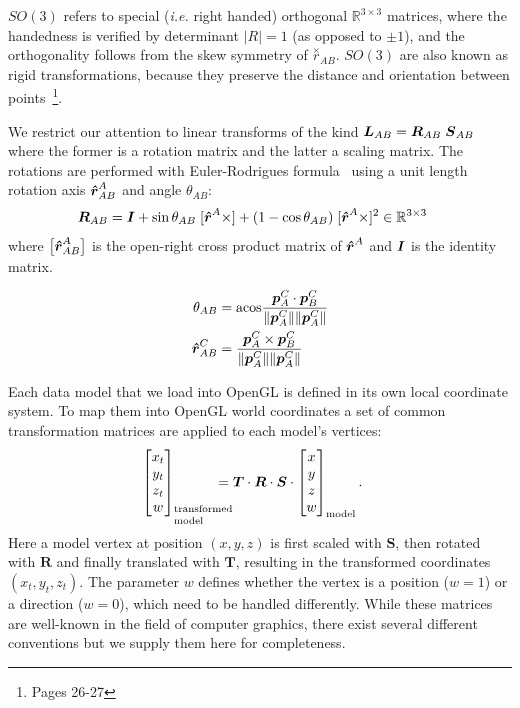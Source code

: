 $SO(3)$ refers to special (\emph{i.e.} right handed) orthogonal $\mathbb{R}^{3\times3}$ matrices, where the handedness is verified by determinant $\big|R\big|=1$ (as opposed to $\pm1$), and the orthogonality follows from the skew symmetry of $\overset{\times}{r}_{AB}$. $SO(3)$ are also known as rigid transformations, because they preserve the distance and orientation between points~\cite{Murray1994}\footnote{Pages 26-27}.

We restrict our attention to linear transforms of the kind $\boldsymbol{L}_{AB} = \boldsymbol{R}_{AB}\;\boldsymbol{S}_{AB}$ where the former is a rotation matrix and the latter a scaling matrix. The rotations are performed with Euler-Rodrigues formula~\cite{Dai2015} using a unit length rotation axis $\boldsymbol{\hat{r}}_{AB}^A$ and angle $\theta_{AB}$:
%
\begin{align}\label{eq:M}
\mat{R}_{AB} &= \I + \sin\theta_{AB}\;[\dvec{\hat{r}}^A\times] + (1-\cos\theta_{AB})\;[\dvec{\hat{r}}^A\times]^2 \in\mathbb{R}^{3\times3}
\end{align}
%
where $\big[\boldsymbol{\hat{r}}_{AB}^A\big]$ is the open-right cross product matrix of $\boldsymbol{\hat{r}}^A$ and $\boldsymbol{I}$ is the identity matrix. 

\begin{align}
\theta_{AB}
&= \mathrm{acos}\frac{\boldsymbol{p}_{A}^{C}\cdot\boldsymbol{p}_{B}^{C}}{\lVert\boldsymbol{p}_{A}^{C}\rVert\lVert\boldsymbol{p}_{A}^{C}\rVert} \\
\boldsymbol{\hat{r}}_{AB}^C &=  \frac{\boldsymbol{p}_{A}^{C}\times\boldsymbol{p}_{B}^{C}}{\lVert\boldsymbol{p}_{A}^{C}\rVert\lVert\boldsymbol{p}_{A}^{C}\rVert}
\end{align}


Each data model that we load into OpenGL is defined in its own local coordinate system. To map them into OpenGL world coordinates a set of common transformation matrices are applied to each model's vertices:
%
\begin{align}
\bmat{x_t \\ y_t \\ z_t \\ w}_\text{\parbox{1cm}{\setlength\baselineskip{0.3cm}transformed\\model}} &= \boldsymbol{T} \cdot \boldsymbol{R} \cdot \boldsymbol{S} \cdot \bmat{x \\ y \\ z \\ w}_\text{model}.
\end{align}
%
Here a model vertex at position $(x,y,z)$ is first scaled with $\boldsymbol{S}$, then rotated with $\boldsymbol{R}$ and finally translated with $\boldsymbol{T}$, resulting in the transformed coordinates $(x_t,y_t,z_t)$. The parameter $w$ defines whether the vertex is a position ($w=1$) or a direction ($w=0$), which need to be handled differently. While these matrices are well-known in the field of computer graphics, there exist several different conventions but we supply them here for completeness.


